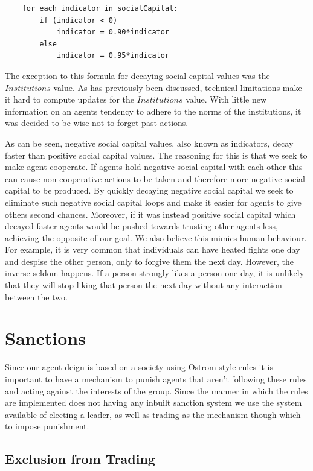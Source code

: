 \begin{verbatim}
    for each indicator in socialCapital:
        if (indicator < 0)
            indicator = 0.90*indicator
        else
            indicator = 0.95*indicator
\end{verbatim}

The exception to this formula for decaying social capital values was the $Institutions$ value. As has previously been discussed, technical limitations make it hard to compute updates for the $Institutions$ value. With little new information on an agents tendency to adhere to the norms of the institutions, it was decided to be wise not to forget past actions.

As can be seen, negative social capital values, also known as indicators, decay faster than positive social capital values. The reasoning for this is that we seek to make agent cooperate. If agents hold negative social capital with each other this can cause non-cooperative actions to be taken and therefore more negative social capital to be produced. By quickly decaying negative social capital we seek to eliminate such negative social capital loops and make it easier for agents to give others second chances. Moreover, if it was instead positive social capital which decayed faster agents would be pushed towards trusting other agents less, achieving the opposite of our goal. We also believe this mimics human behaviour. For example, it is very common that individuals can have heated fights one day and despise the other person, only to forgive them the next day. However, the inverse seldom happens. If a person strongly likes a person one day, it is unlikely that they will stop liking that person the next day without any interaction between the two.

\section{Sanctions}
Since our agent deign is based on a society using Ostrom style rules it is important to have a mechanism to punish agents that aren't following these rules and acting against the interests of the group. Since the manner in which the rules are implemented does not having any inbuilt sanction system we use the system available of electing a leader, as well as trading as the mechanism though which to impose punishment.

\subsection{Exclusion from Trading}

